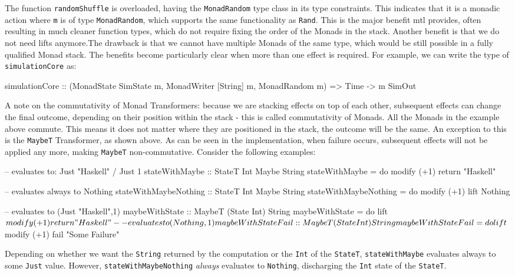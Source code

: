 The function \texttt{randomShuffle} is overloaded, having the \texttt{MonadRandom} type class in its type constraints. This indicates that it is a monadic action where \texttt{m} is of type \texttt{MonadRandom}, which supports the same functionality as \texttt{Rand}. This is the major benefit mtl provides, often resulting in much cleaner function types, which do not require fixing the order of the Monads in the stack. Another benefit is that we do not need lifts anymore.The drawback is that we cannot have multiple Monads of the same type, which would be still possible in a fully qualified Monad stack. The benefits become particularly clear when more than one effect is required. For example, we can write the type of \texttt{simulationCore} as:

\begin{HaskellCode}
simulationCore :: (MonadState SimState m, MonadWriter [String] m, MonadRandom m) 
               => Time -> m SimOut
\end{HaskellCode}

A note on the commutativity of Monad Transformers: because we are stacking effects on top of each other, subsequent effects can change the final outcome, depending on their position within the stack - this is called commutativity of Monads. All the Monads in the example above commute. This means it does not matter where they are positioned in the stack, the outcome will be the same. An exception to this is the \texttt{MaybeT} Transformer, as shown above. As can be seen in the implementation, when failure occurs, subsequent effects will not be applied any more, making \texttt{MaybeT} non-commutative. Consider the following examples:

\begin{HaskellCode}
-- evaluates to: Just "Haskell" / Just 1
stateWithMaybe :: StateT Int Maybe String
stateWithMaybe = do
  modify (+1)
  return "Haskell"

-- evaluates always to Nothing
stateWithMaybeNothing :: StateT Int Maybe String
stateWithMaybeNothing = do
  modify (+1)
  lift Nothing

-- evaluates to (Just "Haskell",1)
maybeWithState :: MaybeT (State Int) String
maybeWithState = do
  lift $ modify (+1)
  return "Haskell"

-- evaluates to (Nothing,1)
maybeWithStateFail :: MaybeT (State Int) String
maybeWithStateFail = do
  lift $ modify (+1)
  fail "Some Failure"
\end{HaskellCode}

Depending on whether we want the \texttt{String} returned by the computation or the \texttt{Int} of the \texttt{StateT}, \texttt{stateWithMaybe} evaluates always to some \texttt{Just} value. However, \texttt{stateWithMaybeNothing} \textit{always} evaluates to \texttt{Nothing}, discharging the \texttt{Int} state of the \texttt{StateT}.

